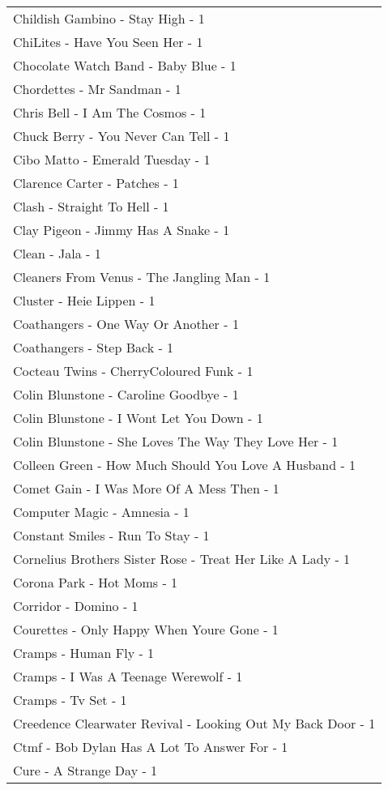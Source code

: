 \documentclass[
]{article}
\begin{document}
\begin{longtable}{l}
Childish Gambino - Stay High - 1 \\ 
ChiLites - Have You Seen Her - 1 \\ 
Chocolate Watch Band - Baby Blue - 1 \\ 
Chordettes - Mr Sandman - 1 \\ 
Chris Bell - I Am The Cosmos - 1 \\ 
Chuck Berry - You Never Can Tell - 1 \\ 
Cibo Matto - Emerald Tuesday - 1 \\ 
Clarence Carter - Patches - 1 \\ 
Clash - Straight To Hell - 1 \\ 
Clay Pigeon - Jimmy Has A Snake - 1 \\ 
Clean - Jala - 1 \\ 
Cleaners From Venus - The Jangling Man - 1 \\ 
Cluster - Heie Lippen - 1 \\ 
Coathangers - One Way Or Another - 1 \\ 
Coathangers - Step Back - 1 \\ 
Cocteau Twins - CherryColoured Funk - 1 \\ 
Colin Blunstone - Caroline Goodbye - 1 \\ 
Colin Blunstone - I Wont Let You Down - 1 \\ 
Colin Blunstone - She Loves The Way They Love Her - 1 \\ 
Colleen Green - How Much Should You Love A Husband - 1 \\ 
Comet Gain - I Was More Of A Mess Then - 1 \\ 
Computer Magic - Amnesia - 1 \\ 
Constant Smiles - Run To Stay - 1 \\ 
Cornelius Brothers Sister Rose - Treat Her Like A Lady - 1 \\ 
Corona Park - Hot Moms - 1 \\ 
Corridor - Domino - 1 \\ 
Courettes - Only Happy When Youre Gone - 1 \\ 
Cramps - Human Fly - 1 \\ 
Cramps - I Was A Teenage Werewolf - 1 \\ 
Cramps - Tv Set - 1 \\ 
Creedence Clearwater Revival - Looking Out My Back Door - 1 \\ 
Ctmf - Bob Dylan Has A Lot To Answer For - 1 \\ 
Cure - A Strange Day - 1 \\ 

\end{longtable}
\end{document}
